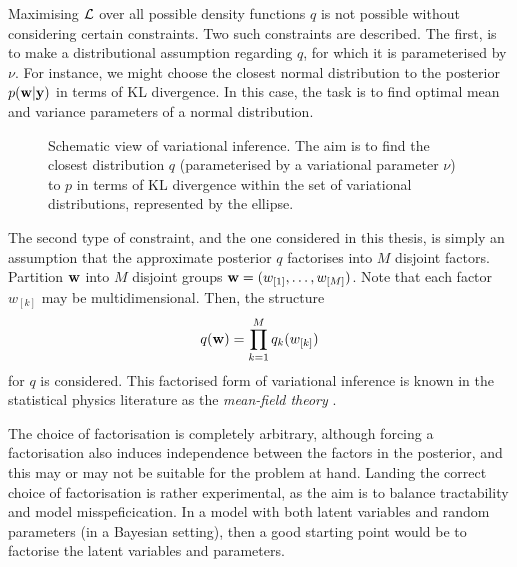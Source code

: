 Maximising ${\mathcal L}$ over all possible density functions $q$ is not possible without considering certain constraints.
Two such constraints are described. 
The first, is to make a distributional assumption regarding $q$, for which it is parameterised by $\nu$.
For instance, we might choose the closest normal distribution to the posterior $p({\mathbf w}|{\mathbf y})$ in terms of KL divergence.
In this case, the task is to find optimal mean and variance parameters of a normal distribution.

\begin{figure}[htb]
  \centering
  \vspace{-1em}
  \caption[Schematic view of variational inference]{Schematic view of variational inference\footnotemark. The aim is to find the closest distribution $q$ (parameterised by a variational parameter $\nu$) to $p$ in terms of KL divergence within the set of variational distributions, represented by the ellipse.}
\end{figure}

The second type of constraint, and the one considered in this thesis, is simply an assumption that the approximate posterior $q$ factorises into $M$ disjoint factors.
Partition ${\mathbf w}$ into $M$ disjoint groups ${\mathbf w} = (w_{[1]},\dots,w_{[M]})$.
Note that each factor $w_{[k]}$ may be multidimensional.
Then, the structure
\[
  q({\mathbf w}) = \prod_{k=1}^M q_k(w_{[k]})
\]
for $q$ is considered.
This factorised form of variational inference is known in the statistical physics literature as the \emph{mean-field theory} \citep{itzykson1991statistical}.

\begin{remark}
The choice of factorisation is completely arbitrary, although forcing a factorisation also induces independence between the factors in the posterior, and this may or may not be suitable for the problem at hand.
Landing the correct choice of factorisation is rather experimental, as the aim is to balance tractability and model misspeficication.
In a model with both latent variables and random parameters (in a Bayesian setting), then a good starting point would be to factorise the latent variables and parameters.
\end{remark}

